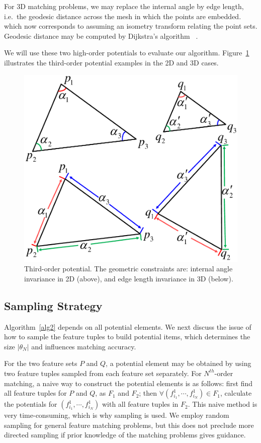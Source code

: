 For 3D matching problems, we may replace the internal angle by edge length, i.e.\ the geodesic distance across the mesh in which the points are embedded. which now corresponds to assuming
an isometry transform relating the point sets.
Geodesic distance may be computed by Dijkstra's algorithm~\cite{Peyre2010} .

We will use these two high-order potentials to evaluate our algorithm.
Figure~\ref{fig:TO} illustrates the third-order potential examples in the 2D and 3D cases.

\begin{figure}
\centering
  \includegraphics[width=0.6\linewidth]{figures/diagram.pdf}
  \caption{Third-order potential. The geometric constraints are: internal angle invariance in 2D (above), and edge length invariance in 3D (below).}
\label{fig:TO}
\end{figure}

\subsection{Sampling Strategy}
\label{subsec:sampling}

Algorithm~\ref{alg2} depends on all potential elements.
We next discuss the issue of how to sample the feature tuples to build potential items, which determines the size $|\theta_N|$ and influences matching accuracy.

For the two feature sets $P$ and $Q$,
a potential element may be obtained by using two feature tuples sampled from each feature set separately.
For $N^{th}$-order matching, a naive way to construct the potential elements is as follows:
first find all feature tuples for $P$ and $Q$, as $F_1$ and $F_2$; then $\forall (f_{i_1}^1, \cdots, f_{i_N}^1)\in F_1$,
calculate the potentials for $(f_{i_1}^1, \cdots, f_{i_N}^1)$ with all feature tuples in $F_2$.
This naive method is very time-consuming, which is why sampling is used.
We employ random sampling for general feature matching problems,
but this does not preclude more directed sampling if prior knowledge of the matching problems gives guidance.

